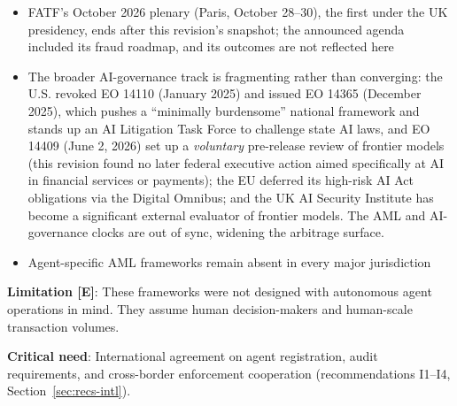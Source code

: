 \documentclass[11pt,letterpaper]{article}
\begin{document}
\begin{infobox}
\begin{itemize}
  \item FATF's October 2026 plenary (Paris, October 28--30), the first under the UK presidency, ends after this revision's snapshot; the announced agenda included its fraud roadmap, and its outcomes are not reflected here
  \item The broader AI-governance track is fragmenting rather than converging: the U.S. revoked EO 14110 (January 2025) and issued EO 14365 (December 2025), which pushes a ``minimally burdensome'' national framework and stands up an AI Litigation Task Force to challenge state AI laws, and EO 14409 (June 2, 2026) set up a \textit{voluntary} pre-release review of frontier models (this revision found no later federal executive action aimed specifically at AI in financial services or payments); the EU deferred its high-risk AI Act obligations via the Digital Omnibus; and the UK AI Security Institute has become a significant external evaluator of frontier models. The AML and AI-governance clocks are out of sync, widening the arbitrage surface.
  \item Agent-specific AML frameworks remain absent in every major jurisdiction
\end{itemize}

\textbf{Limitation [E]}: These frameworks were not designed with autonomous agent operations in mind. They assume human decision-makers and human-scale transaction volumes.
\end{infobox}

\textbf{Critical need}: International agreement on agent registration, audit requirements, and cross-border enforcement cooperation (recommendations I1--I4, Section~\ref{sec:recs-intl}).
\end{document}
